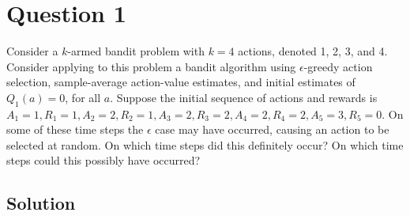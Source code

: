 \section*{Question 1}

Consider a \( k \)-armed bandit problem with \( k = 4 \) actions, denoted 1, 2, 3, and 4.
Consider applying to this problem a bandit algorithm using \( \epsilon \)-greedy action selection, sample-average action-value estimates, and initial estimates of \( Q_{1}(a) = 0 \), for all \( a \).
Suppose the initial sequence of actions and rewards is \( A_{1} = 1, R_{1} = 1, A_{2} = 2, R_{2} = 1, A_{3} = 2, R_{3} = 2, A_{4} = 2, R_{4} = 2, A_{5} = 3, R_{5} = 0 \).
On some of these time steps the \( \epsilon \) case may have occurred, causing an action to be selected at random.
On which time steps did this definitely occur?
On which time steps could this possibly have occurred?

\subsection*{Solution}
